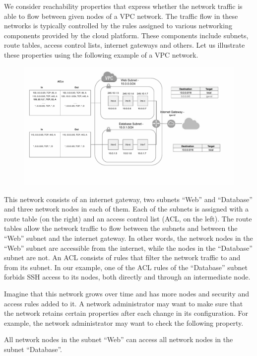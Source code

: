 We consider reachability properties that express whether the network traffic is able to flow between given nodes of a VPC network. The traffic flow in these networks is typically controlled by the rules assigned to various networking components provided by the cloud platform. These components include subnets, route tables, access control lists, internet gateways and others. Let us illustrate these properties using the following example of a VPC network. 
\begin{figure}[th]
\centering\includegraphics[width=1.0\textwidth]{./aws/fig/vpc2.pdf}
\end{figure}

This network consists of an internet gateway, two subnets ``Web'' and ``Database'' and three network nodes in each of them. Each of the subnets is assigned with a route table (on the right) and an access control list (ACL, on the left). The route tables allow the network traffic to flow between the subnets and between the ``Web'' subnet and the internet gateway. In other words, the network nodes in the ``Web'' subnet are accessible from the internet, while the nodes in the ``Database'' subnet are not. An ACL consists of rules that filter the network traffic to and from its subnet. In our example, one of the ACL rules of the ``Database'' subnet forbids SSH access to its nodes, both directly and through an intermediate node.

Imagine that this network grows over time and has more nodes and security and access rules added to it. A network administrator may want to make sure that the network retains certain properties after each change in its configuration. For example, the network administrator may want to check the following property.
\begin{example}\label{prop:bool-property}
All network nodes in the subnet ``Web'' can access all network nodes in the subnet ``Database''.
\end{example}

